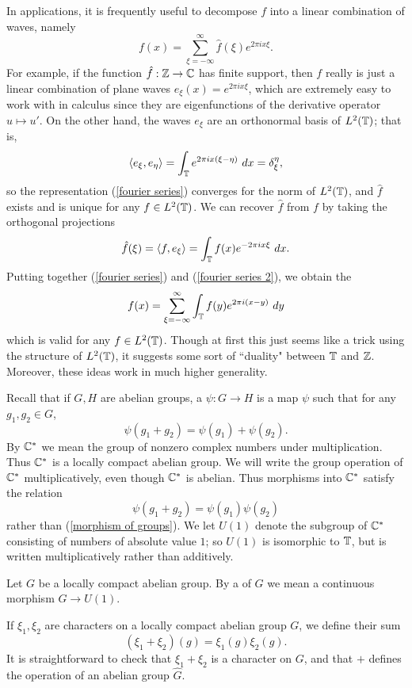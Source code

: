In applications, it is frequently useful to decompose $f$ into a linear combination of waves, namely
\begin{equation}
\label{fourier series}
f(x) = \sum_{\xi=-\infty}^\infty \hat f(\xi) e^{2\pi ix\xi}.
\end{equation}
For example, if the function $\hat f: \mathbb{Z} \to \mathbb{C}$ has finite support, then $f$ really is just a linear combination of plane waves $e_\xi(x) = e^{2\pi i x\xi}$, which are extremely easy to work with in calculus since they are eigenfunctions of the derivative operator $u \mapsto u'$.
On the other hand, the waves $e_\xi$ are an orthonormal basis of $L^2(\mathbb{T})$; that is,
$$\langle e_\xi, e_\eta\rangle = \int_{\mathbb{T}} e^{2\pi i x(\xi - \eta)} ~dx = \delta_\xi^\eta,$$
so the representation (\ref{fourier series}) converges for the norm of $L^2(\mathbb{T})$, and $\hat f$ exists and is unique for any $f \in L^2(\mathbb{T})$.
We can recover $\hat f$ from $f$ by taking the orthogonal projections
\begin{equation}
\label{fourier series 2}
\hat f(\xi) = \langle f, e_\xi\rangle = \int_{\mathbb{T}} f(x) e^{-2\pi ix\xi} ~dx.
\end{equation}
Putting together (\ref{fourier series}) and (\ref{fourier series 2}), we obtain the 
\begin{equation}
\label{fourier series 3}
f(x) = \sum_{\xi = -\infty}^\infty \int_{\mathbb{T}} f(y) e^{2\pi i(x-y)}~dy
\end{equation}
which is valid for any $f \in L^2(\mathbb{T})$. Though at first this just seems like a trick using the structure of $L^2(\mathbb{T})$, it suggests some sort of ``duality" between $\mathbb{T}$ and $\mathbb{Z}$.
Moreover, these ideas work in much higher generality.

Recall that if $G,H$ are abelian groups, a  $\psi: G \to H$ is a map $\psi$ such that for any $g_1, g_2 \in G$,
\begin{equation}
\label{morphism of groups}
\psi(g_1 + g_2) = \psi(g_1) + \psi(g_2).
\end{equation}
By $\mathbb{C}^*$ we mean the group of nonzero complex numbers under multiplication. Thus $\mathbb{C}^*$ is a locally compact abelian group.
We will write the group operation of $\mathbb{C}^*$ multiplicatively, even though $\mathbb{C}^*$ is abelian. Thus morphisms into $\mathbb{C}^*$ satisfy the relation
$$\psi(g_1 + g_2) = \psi(g_1)\psi(g_2)$$
rather than (\ref{morphism of groups}).
We let $U(1)$ denote the subgroup of $\mathbb{C}^*$ consisting of numbers of absolute value $1$; so $U(1)$ is isomorphic to $\mathbb{T}$, but is written multiplicatively rather than additively.
\begin{definition}
Let $G$ be a locally compact abelian group.
By a  of $G$ we mean a continuous morphism $G \to U(1)$.
\end{definition}
If $\xi_1, \xi_2$ are characters on a locally compact abelian group $G$, we define their sum
$$(\xi_1 + \xi_2)(g) = \xi_1(g)\xi_2(g).$$
It is straightforward to check that $\xi_1 + \xi_2$ is a character on $G$, and that $+$ defines the operation of an abelian group $\hat G$.

